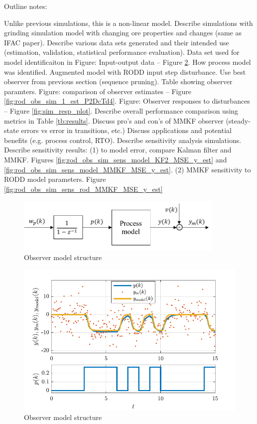 Outline notes:
\begin{outline}
	\1 Unlike previous simulations, this is a non-linear model.
	\1 Describe simulations with grinding simulation model with changing ore properties and changes (same as IFAC paper).
	\1 Describe various data sets generated and their intended use (estimation, validation, statistical performance evaluation).
	\1 Data set used for model identificaiton in Figure: Input-output data – Figure \ref{fig:rod_obs_sim_1_ioplot_P2DcTd4}.
	\1 How process model was identified.
	\1 Augmented model with RODD input step disturbance.
	\1 Use best observer from previous section (sequence pruning).
	\1 Table showing observer paramters.
	\1 Figure: comparison of observer estimates – Figure \ref{fig:rod_obs_sim_1_est_P2DcTd4}.
	\1 Figure: Observer responses to disturbances – Figure \ref{fig:sim_resp_plot}.
	\1 Describe overall performance comparison using metrics in Table \ref{tb:results}.
	\1 Discuss pro's and con's of MMKF observer (steady-state errors vs error in transitions, etc.)
	\1 Discuss applications and potential benefits (e.g. process control, RTO).
	\1 Describe sensitivity analysis simulations.
	\1 Describe sensitivity results:
	\2 (1) to model error, compare Kalman filter and MMKF. Figures \ref{fig:rod_obs_sim_sens_model_KF2_MSE_y_est} and \ref{fig:rod_obs_sim_sens_model_MMKF_MSE_y_est}.
	\2 (2) MMKF sensitivity to RODD model parameters. Figure  \ref{fig:rod_obs_sim_sens_rod_MMKF_MSE_y_est}
\end{outline}

\begin{figure}[htp]
	\centering
	\includegraphics[width=10cm]{images/obs-model-diag.pdf}
	\caption{Observer model structure}
	\label{fig:obs_model}
\end{figure}

\begin{figure}[htp]
	\centering
	\includegraphics[width=12cm]{images/rod_obs_sim_1_ioplot_P2DcTd4.pdf}
	\caption{Observer model structure}
	\label{fig:rod_obs_sim_1_ioplot_P2DcTd4}
\end{figure}

